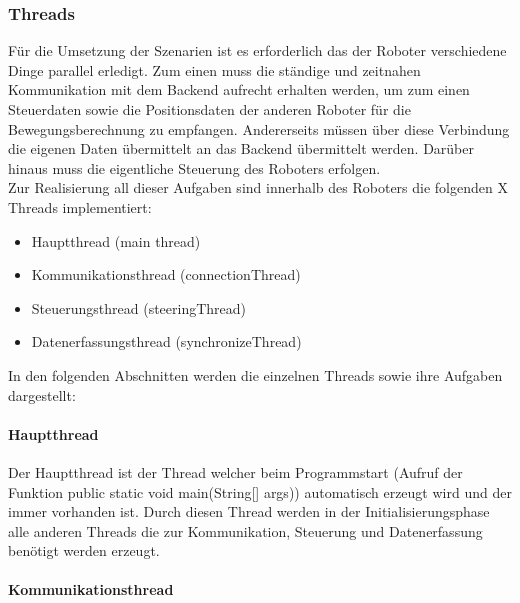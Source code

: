 \subsubsection{Threads}
Für die Umsetzung der Szenarien ist es erforderlich das der Roboter verschiedene Dinge parallel erledigt. Zum einen muss die 
ständige und zeitnahen Kommunikation mit dem Backend aufrecht erhalten werden, um zum einen Steuerdaten sowie die Positionsdaten
der anderen Roboter für die Bewegungsberechnung zu empfangen. Andererseits müssen über diese Verbindung die eigenen Daten übermittelt
an das Backend übermittelt werden. Darüber hinaus muss die eigentliche Steuerung des Roboters erfolgen. \\
Zur Realisierung all dieser Aufgaben sind innerhalb des Roboters die folgenden X Threads implementiert:
\begin{itemize}
	\item{Hauptthread (main thread)}
	\item{Kommunikationsthread (connectionThread)}
	\item{Steuerungsthread (steeringThread)}
	\item{Datenerfassungsthread (synchronizeThread)}
\end{itemize}
In den folgenden Abschnitten werden die einzelnen Threads sowie ihre Aufgaben dargestellt:
\paragraph{Hauptthread}
Der Hauptthread ist der Thread welcher beim Programmstart (Aufruf der Funktion public static void main(String[] args)) automatisch 
erzeugt wird und der immer vorhanden ist. Durch diesen Thread werden in der Initialisierungsphase alle anderen Threads die 
zur Kommunikation, Steuerung und Datenerfassung benötigt werden erzeugt. 
\paragraph{Kommunikationsthread}
